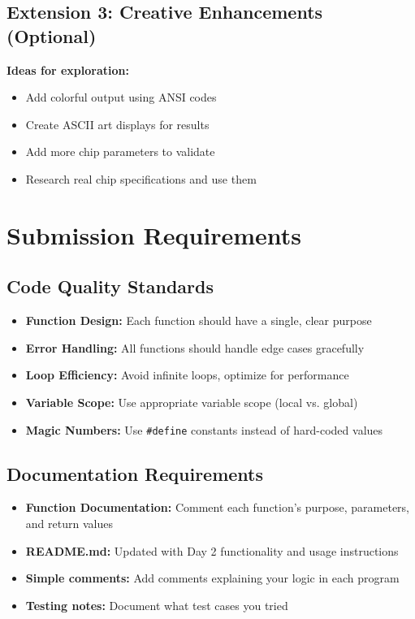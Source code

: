 \documentclass[11pt,a4paper]{article}
\begin{document}
\subsection{Extension 3: Creative Enhancements (Optional)}

\textbf{Ideas for exploration:}
\begin{itemize}
    \item Add colorful output using ANSI codes
    \item Create ASCII art displays for results
    \item Add more chip parameters to validate
    \item Research real chip specifications and use them
\end{itemize}

\section{Submission Requirements}

\subsection{Code Quality Standards}
\begin{itemize}
    \item \textbf{Function Design:} Each function should have a single, clear purpose
    \item \textbf{Error Handling:} All functions should handle edge cases gracefully
    \item \textbf{Loop Efficiency:} Avoid infinite loops, optimize for performance
    \item \textbf{Variable Scope:} Use appropriate variable scope (local vs. global)
    \item \textbf{Magic Numbers:} Use \texttt{\#define} constants instead of hard-coded values
\end{itemize}

\subsection{Documentation Requirements}
\begin{itemize}
    \item \textbf{Function Documentation:} Comment each function's purpose, parameters, and return values
    \item \textbf{README.md:} Updated with Day 2 functionality and usage instructions
    \item \textbf{Simple comments:} Add comments explaining your logic in each program
    \item \textbf{Testing notes:} Document what test cases you tried
\end{itemize}
\end{document}
